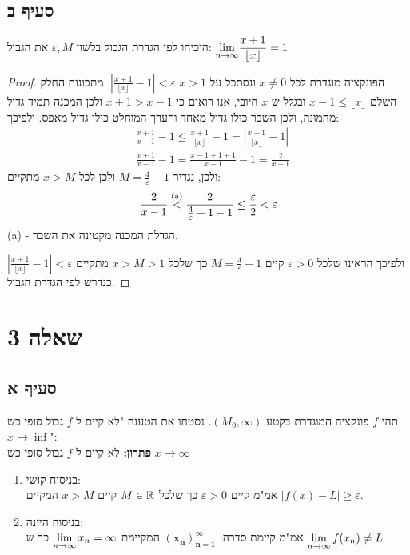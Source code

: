 \documentclass{article}
\begin{document}
	\subsection*{סעיף ב}
	הוכיחו לפי הגדרת הגבול בלשון $\varepsilon, M$ את הגבול: $\displaystyle{\lim_{n \to \infty}}{\frac{x+1}{\lfloor x \rfloor}} = 1$
	\begin{proof}
		הפונקציה מוגדרת לכל $x \neq 0$ ונסתכל על $x > 1$
		$\left| \frac{x+1}{\lfloor x \rfloor} - 1 \right| < \varepsilon$,
		מתכונות החלק השלם $x-1 \leq \lfloor x \rfloor$ ובגלל ש $x$ חיובי, אנו רואים כי $x+1>x-1$ ולכן המכנה תמיד גדול מהמונה, ולכן השבר כולו גדול מאחד והערך המוחלט כולו גדול מאפס.
		ולפיכך:
		\begin{align*}
			&\frac{x+1}{x-1}-1 \leq \frac{x+1}{\lfloor x \rfloor} - 1 = \left|\frac{x+1}{\lfloor x \rfloor} - 1 \right| \\
			&\frac{x+1}{x-1}-1 =
			\frac{x-1+1+1}{x-1} -1 =
			\frac{2}{x-1}
		\end{align*}
		ולכן, נגדיר $M = \frac{4}{\varepsilon} + 1$ ולכן לכל $x > M$ מתקיים: \\
		\begin{align*}
			\frac{2}{x-1} \overset{\text{(a)}} < \frac{2}{\frac{4}{\varepsilon} + 1 - 1} \leq \frac{\varepsilon}{2} < \varepsilon
		\end{align*}
		(a) - הגדלת המכנה מקטינה את השבר.

		ולפיכך הראינו שלכל $\varepsilon > 0$ קיים $M = \frac{4}{\varepsilon}+1$ כך שלכל $x > M > 1$ מתקיים $\left| \frac{x+1}{\lfloor x \rfloor} - 1 \right| < \varepsilon$ כנדרש לפי הגדרת הגבול.
	\end{proof}

	\pagebreak
	\section*{שאלה 3}
	\subsection*{סעיף א}
	תהי $f$ פונקציה המוגדרת בקטע $(M_0, \infty)$.
	נסטחו את הטענה "לא קיים ל $f$ גבול סופי כש $x \to \inf$": \\
	\textbf{פתרון:}  לא קיים ל $f$ גבול סופי כש $x \to \infty$
	\begin{enumerate}
		\item בניסוח קושי: \\ אמ"מ קיים $\varepsilon > 0$ כך שלכל $M \in \mathbb{R}$ קיים $x > M$ המקיים $|f(x)-L| \geq \varepsilon$.
		\item בניסוח היינה: \\ אמ"מ קיימת סדרה: $\bm{(x_n)_{n=1}^\infty}$ המקיימת $\displaystyle{\lim_{n \to \infty}x_n = \infty}$ כך ש $\displaystyle{\lim_{n \to \infty}f(x_n) \not= L}$
	\end{enumerate}
\end{document}
